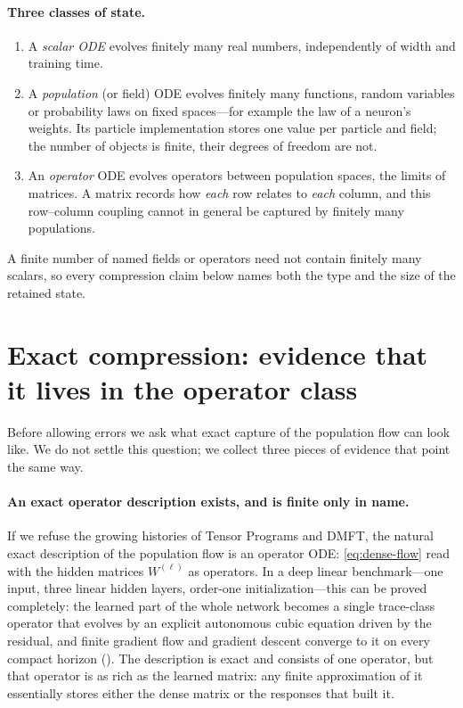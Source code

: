 \documentclass[11pt]{article}
\theoremstyle{definition}
\theoremstyle{remark}
\begin{document}
\paragraph{Three classes of state.}
\begin{enumerate}
\item A \emph{scalar ODE} evolves finitely many real numbers, independently of
width and training time.
\item A \emph{population} (or field) ODE evolves finitely many functions, random
variables or probability laws on fixed spaces---for example the law of a neuron's
weights.  Its particle implementation stores one value per particle and field;
the number of objects is finite, their degrees of freedom are not.
\item An \emph{operator} ODE evolves operators between population spaces, the
limits of matrices.  A matrix records how \emph{each} row relates to \emph{each}
column, and this row--column coupling cannot in general be captured by finitely
many populations.
\end{enumerate}
A finite number of named fields or operators need not contain finitely many
scalars, so every compression claim below names both the type and the size of
the retained state.

\section{Exact compression: evidence that it lives in the operator class}
\label{sec:exact}

Before allowing errors we ask what exact capture of the population flow can look
like.  We do not settle this question; we collect three pieces of evidence that
point the same way.

\paragraph{An exact operator description exists, and is finite only in name.}
If we refuse the growing histories of Tensor Programs and DMFT, the natural
exact description of the population flow is an operator ODE: \eqref{eq:dense-flow}
read with the hidden matrices $W^{(\ell)}$ as operators.  In a deep linear
benchmark---one input, three linear hidden layers, order-one initialization---this
can be proved completely: the learned part of the whole network becomes a single
trace-class operator that evolves by an explicit autonomous cubic equation
driven by the residual, and finite gradient flow and gradient descent converge
to it on every compact horizon ().  The description is exact and
consists of one operator, but that operator is as rich as the learned matrix:
any finite approximation of it essentially stores either the dense matrix or the
responses that built it.
\end{document}

